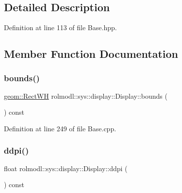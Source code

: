 \subsection{Detailed Description}


Definition at line 113 of file Base.\+hpp.



\subsection{Member Function Documentation}
\mbox{\label{structrolmodl_1_1sys_1_1display_1_1_display_a51baa2e22efec2aff450a1062b1dbba6}} 
\subsubsection{\texorpdfstring{bounds()}{bounds()}}
{\footnotesize\ttfamily \mbox{\hyperlink{structrolmodl_1_1geom_1_1_rect_w_h}{geom\+::\+Rect\+WH}} rolmodl\+::sys\+::display\+::\+Display\+::bounds (\begin{DoxyParamCaption}{ }\end{DoxyParamCaption}) const\hspace{0.3cm}{\ttfamily [noexcept]}}



Definition at line 249 of file Base.\+cpp.

\mbox{\label{structrolmodl_1_1sys_1_1display_1_1_display_a1c059d3652f60e71fdf9dc96324a72cf}} 
\subsubsection{\texorpdfstring{ddpi()}{ddpi()}}
{\footnotesize\ttfamily float rolmodl\+::sys\+::display\+::\+Display\+::ddpi (\begin{DoxyParamCaption}{ }\end{DoxyParamCaption}) const\hspace{0.3cm}{\ttfamily [noexcept]}}



